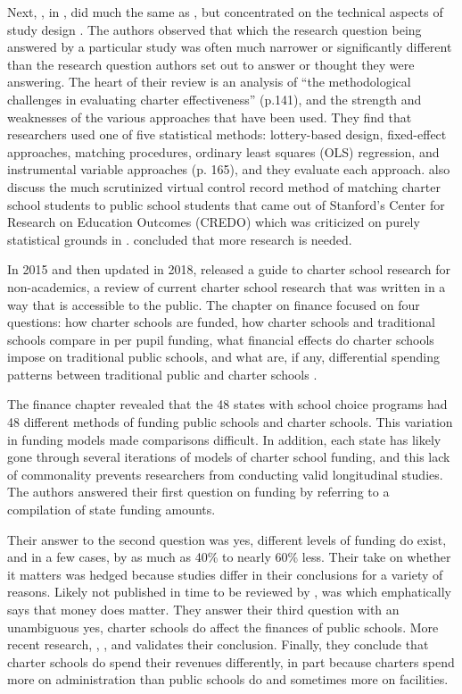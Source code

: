 Next, \textcite{Epple.etal2016}, in , did much the same as \citeauthor{Berends2015}, but concentrated on the technical aspects of study design \parencite{Epple.etal2016}. The authors observed that which the research question being answered by a particular study was often much narrower or significantly different than the research question authors set out to answer or thought they were answering. The heart of their review is an analysis of ``the methodological challenges in evaluating charter effectiveness'' (p.141), and the strength and weaknesses of the various approaches that have been used. They find that researchers used one of five statistical methods: lottery-based design, fixed-effect approaches,  matching procedures, ordinary least squares (OLS) regression, and instrumental variable approaches (p. 165), and they evaluate each approach. \citeauthor{Epple.etal2016} also discuss the much scrutinized virtual control record method of matching charter school students to public school students that came out of Stanford's Center for Research on Education Outcomes (CREDO) which was criticized on purely statistical grounds in \textcite{Gabor2015}. \citeauthor{Epple.etal2016} concluded that more research is needed. %

In 2015 and then updated in 2018, \citeauthor{PublicAgenda2018} released a guide to charter school research for non-academics, a review of current charter school research that was written in a way that is accessible to the public. The chapter on finance focused on four questions: how charter schools are funded, how charter schools and traditional schools compare in per pupil funding, what financial effects do charter schools impose on traditional public schools, and what are, if any, differential spending patterns between traditional public and charter schools \parencite[78–89]{PublicAgenda2018}.

The finance chapter revealed that the 48 states with school choice programs had 48 different methods of funding public schools and charter schools. This variation in funding models made comparisons difficult. In addition, each state has likely gone through several iterations of models of charter school funding, and this lack of commonality prevents researchers from conducting valid longitudinal studies. The authors answered their first question on funding by referring to a compilation of state funding amounts.

Their answer to the second question was yes, different levels of funding do exist, and in a few cases, by as much as 40\% to nearly 60\% less. Their take on whether it matters was hedged because studies differ in their conclusions for a variety of reasons. Likely not published in time to be reviewed by \citeauthor{PublicAgenda2018}, was \textcite{Baker2018a} which emphatically says that money does matter. They answer their third question with an unambiguous yes, charter schools do affect the finances of public schools. More recent research, \textcite{Lafer2018}, \textcite{Baker2019},  and \textcite{Miron.etal2021} validates their conclusion. Finally, they conclude that charter schools do spend their revenues differently, in part because charters spend more on administration than public schools do and sometimes more on facilities. 


